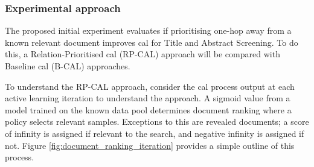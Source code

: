 \documentclass[10pt,oneside]{book}
\begin{document}
\subsubsection{Experimental approach}

The proposed initial experiment evaluates if prioritising one-hop away from a known relevant document improves \gls*{cal} for Title and Abstract Screening. To do this, a Relation-Prioritised \gls*{cal} (RP-CAL) approach will be compared with Baseline \gls*{cal} (B-CAL) approaches. 

To understand the RP-CAL approach, consider the \gls*{cal} process output at each active learning iteration to understand the approach. A sigmoid value from a model trained on the known data pool determines document ranking where a policy selects relevant samples. Exceptions to this are revealed documents; a score of infinity is assigned if relevant to the search, and negative infinity is assigned if not. Figure \ref{fig:document_ranking_iteration} provides a simple outline of this process.
\end{document}
